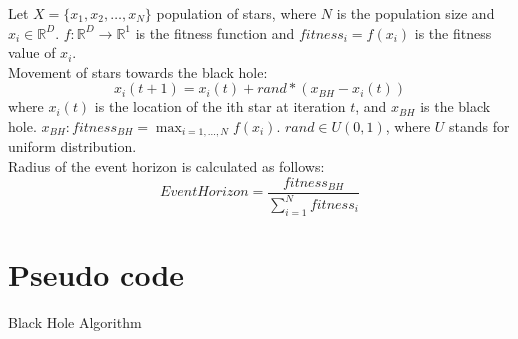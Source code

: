 \documentclass[border=0.2cm]{report}
\newcommand{\R}{\mathbb{R}} %
\begin{document}
\noindent
Let $X=\{x_1,x_2,\ldots,x_N\}$ population of stars, where $N$ is the population size and $x_i \in \R^D$.
$f: \R^{D}\to\R^1$ is the fitness function and $fitness_i=f(x_i)$ is the fitness value of $x_i$.\\
\noindent
Movement of stars towards the black hole:
\begin{equation}\label{eqn_bha_step}
x_i(t+1)=x_i(t)+rand*(x_{BH}-x_i(t))
\end{equation}
where $x_i(t)$ is the location of the ith star at iteration $t$, and $x_{BH}$ is the black hole. $x_{BH}: fitness_{BH}=\displaystyle \max_{i=1,\dots, N}f(x_i)$. $rand \in U(0, 1)$, where $U$ stands for uniform distribution.\\
\noindent
Radius of the event horizon is calculated as follows:
\begin{equation}\label{eqn_bha_event_horizon}
Event Horizon=\frac{fitness_{BH}}{\sum\limits_{i=1}^N fitness_i}
\end{equation}



\section{Pseudo code}

\begin{algorithm}[H]
\caption{Black Hole Algorithm}
 
\end{algorithm}
\end{document}
